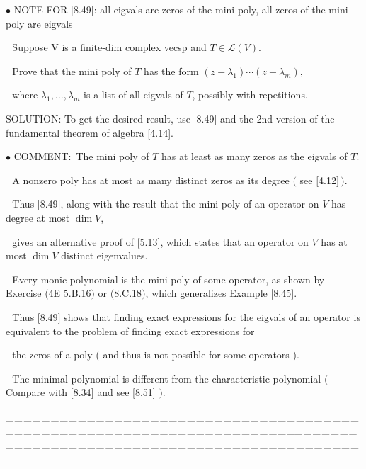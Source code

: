 \documentclass[a4paper, 11pt, UTF8]{article}
\def\Lm{\mathcal{L}}
\begin{document}
\begin{large}
{\small $\bullet$} {\timesbf\Large N{\normalsize OTE} F{\normalsize OR} [8.49]:} {\timessl\normalsize all eigvals are zeros of the mini poly, all zeros of the mini poly are eigvals}\par\,\,
{\timessl\Large Suppose V is a finite-dim complex vecsp } {\timessl and $T\in\Lm(V).$}\par\,\,
{\timessl Prove that the mini poly of $T$ has the
form $(z -\lambda_1 ) \cdots (z - \lambda_m)$,}\par\,\,
{\timessl where $\lambda_1,\dots,\lambda_m$ is a list of all eigvals of $T$, possibly with repetitions.}\par
{\timesbf S\footnotesize{OLUTION:}} To get the desired result, use [8.49] and the 2nd version of the fundamental
theorem of algebra [4.14].\par
{\small $\bullet$} {\timesbf C{\small OMMENT}}:
{\timessl \,The mini poly of $T$ has at least as many zeros as the eigvals of $T.$}\par\,\,
{\timessl\normalsize A nonzero poly has at most as many distinct zeros as its degree $($ see $[$4.12$]\,)$.}\par\,\,
{\timessl\normalsize Thus $[$8.49$]$, along with the result that the mini poly of an operator on $V$ has degree at most $\dim V$,}{\footnotesize\par}\,\,
{\timessl\normalsize {\timessc gives an alternative proof of} $[$5.13$]$, which states that an operator on $V$ has at most $\dim V$ distinct eigenvalues.}{\footnotesize\par}\,\,
{\timessl\footnotesize Every monic polynomial is the mini poly of some operator, as shown by Exercise $($4E 5.B.16$)$ or $($8.C.18$)$, which generalizes Example $[$8.45$]$.}{\small\par}\,\,
{\timessl\footnotesize Thus $[$8.49$]$ shows that finding exact expressions for the eigvals of an operator is equivalent to the problem of finding exact expressions for}{\footnotesize\par}\,\,
{\timessl\footnotesize the zeros of a poly ( and thus is not possible for some operators ).}{\footnotesize\par}\,\,
{\timessl The minimal polynomial is different from the {\timessc characteristic polynomial} $($ Compare with $[$8.34$]$ and see [8.51] $)$.}\par
{\tiny \_\,\_\,\_\,\_\,\_\,\_\,\_\,\_\,\_\,\_\,\_\,\_\,\_\,\_\,\_\,\_\,\_\,\_\,\_\,\_\,\_\,\_\,\_\,\_\,\_\,\_\,\_\,\_\,\_\,\_\,\_\,\_\,\_\,\_\,\_\,\_\,\_\,\_\,\_\,\_\,\_\,\_\,\_\,\_\,\_\,\_\,\_\,\_\,\_\,\_\,\_\,\_\,\_\,\_\,\_\,\_\,\_\,\_\,\_\,\_\,\_\,\_\,\_\,\_\,\_\,\_\,\_\,\_\,\_\,\_\,\_\_\,\_\,\_\,\_\,\_\,\_\,\_\,\_\,\_\,\_\,\_\,\_\,\_\,\_\,\_\,\_\,\_\,\_\,\_\,\_\,\_\,\_\,\_\,\_\,\_\,\_\,\_\,\_\,\_\,\_\,\_\,\_\,\_\,\_\,\_\,\_\,\_\,\_\,\_\,\_\,\_\,\_\,\_\,\_\,\_\,\_\,\_\,\_\,\_\,\_\,\_\,\_\,\_\,\_\,\_\,\_\,\_\,\_\,\_\,\_\,\_\,\_\,\_\,\_\,\_\,\_\,\_\,\_\,\_\,\_\,\_}{\tiny\,\par}


\end{large}
\end{document}
